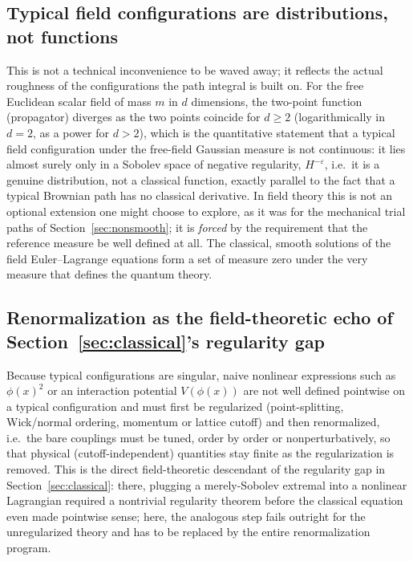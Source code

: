 \documentclass[11pt]{article}
\newcommand{\eps}{\varepsilon}
\begin{document}
\subsection{Typical field configurations are distributions, not functions}

This is not a technical inconvenience to be waved away; it reflects the actual roughness of the configurations the path integral is built on. For the free Euclidean scalar field of mass $m$ in $d$ dimensions, the two-point function (propagator) diverges as the two points coincide for $d\ge 2$ (logarithmically in $d=2$, as a power for $d>2$), which is the quantitative statement that a typical field configuration under the free-field Gaussian measure is not continuous: it lies almost surely only in a Sobolev space of negative regularity, $H^{-\eps}$, i.e.\ it is a genuine distribution, not a classical function, exactly parallel to the fact that a typical Brownian path has no classical derivative. In field theory this is not an optional extension one might choose to explore, as it was for the mechanical trial paths of Section~\ref{sec:nonsmooth}; it is \emph{forced} by the requirement that the reference measure be well defined at all. The classical, smooth solutions of the field Euler--Lagrange equations form a set of measure zero under the very measure that defines the quantum theory.

\subsection{Renormalization as the field-theoretic echo of Section~\ref{sec:classical}'s regularity gap}

Because typical configurations are singular, naive nonlinear expressions such as $\phi(x)^2$ or an interaction potential $V(\phi(x))$ are not well defined pointwise on a typical configuration and must first be regularized (point-splitting, Wick/normal ordering, momentum or lattice cutoff) and then renormalized, i.e.\ the bare couplings must be tuned, order by order or nonperturbatively, so that physical (cutoff-independent) quantities stay finite as the regularization is removed. This is the direct field-theoretic descendant of the regularity gap in Section~\ref{sec:classical}: there, plugging a merely-Sobolev extremal into a nonlinear Lagrangian required a nontrivial regularity theorem before the classical equation even made pointwise sense; here, the analogous step fails outright for the unregularized theory and has to be replaced by the entire renormalization program.
\end{document}
